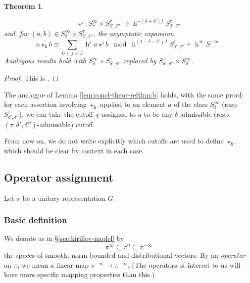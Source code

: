 \documentclass[reqno]{amsart}
\DeclareMathOperator{\h}{h}
\theoremstyle{plain} \newtheorem{theorem} {Theorem}
\theoremstyle{definition} \newtheorem{definition} [theorem] {Definition}
\theoremstyle{itplain} %
\numberwithin{equation}{section}
\numberwithin{theorem}{section}
\renewcommand{\leq}{\leqslant}
\begin{document}
\begin{theorem}
\begin{enumerate}[(i)]
    \begin{equation*}
      \star^j : S^{\infty}_{\delta} \times S^{\tau}_{ \delta
        ', \delta ''}      \rightarrow \h^{-(\delta +  \delta ')
        j}
      S^{\tau}_{ \delta ', \delta ''}
    \end{equation*}
    and, for $(a,b) \in S^{\infty}_{\delta} \times S^{\tau}_{ \delta ', \delta ''}$, the asymptotic expansion
    \begin{equation*}
      a \star_{\h} b
      \equiv  \sum _{0 \leq j < J}
      \h^j a \star^j b
      \mod{
        \h^{(1- \delta - \delta') J}  S^{\tau}_{ \delta ', \delta ''} 
        +
        \h^{\infty} S^{-\infty}}.
    \end{equation*}
    Analogous results hold with $S^{\infty}_{\delta} \times S^{\tau}_{ \delta ', \delta ''}$ replaced by $S^{\tau}_{ \delta ', \delta ''} \times S^{\infty}_{\delta}$.
  \end{enumerate}
\end{theorem}
\begin{proof}
  This is \cite[Thm 9.12]{2020arXiv201202187N}.
\end{proof}

The analogue of Lemma \ref{lem:concl-theor-refthm:b} holds, with the same proof: for each assertion involving $\star_{\h}$ applied to an element $a$ of the class $S_\delta^\infty$ (resp. $S_{\delta ', \delta ''}^{\tau}$), we can take the cutoff $\chi$ assigned to $a$ to be any $\delta$-admissible (resp. $(\tau, \delta ', \delta '')$-admissible) cutoff.

From now on, we do not write explicitly which cutoffs are used to define $\star_{\h}$, which should be clear by context in each case.

\subsection{Operator assignment}
Let $\pi$ be a unitary representation $G$.

\subsubsection{Basic definition}\label{sec:basic-definition}
We denote as in \S\ref{sec:kirillov-model} by
\begin{equation*}
  \pi^\infty \subseteq \pi^0 \subseteq \pi^{-\infty}
\end{equation*}
the spaces of smooth, norm-bounded and distributional vectors.  By an \emph{operator} on $\pi$, we mean a linear map $\pi^{-\infty} \rightarrow \pi^{-\infty}$.  (The operators of interest to us will have more specific mapping properties than this.)
\end{document}
